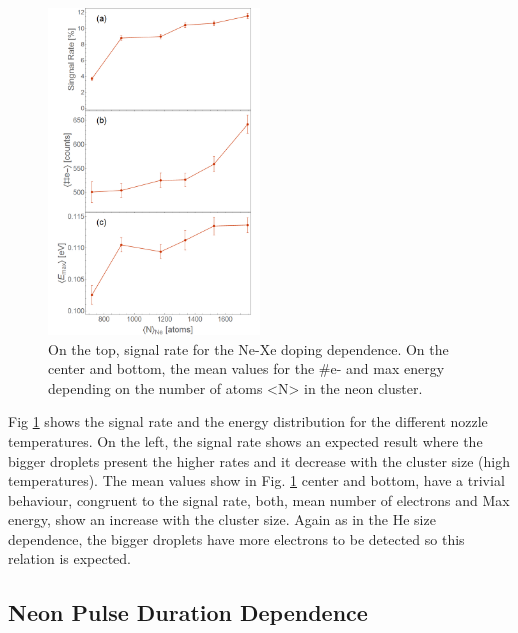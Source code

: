 \begin{figure}[hbtp]
\centering
\includegraphics[width=0.5\textwidth]{../Images/results/MIR_Ne_DropletSize/alltogether.png}
\caption[MIR Ne size dependence. Signal rate and mean values]{On the top, signal rate for the Ne-Xe doping dependence. On the center and bottom, the mean values for the $\#$e- and max energy depending on the number of atoms <N> in the neon cluster.}
\label{fig:Nesizeall}
\end{figure}

Fig \ref{fig:Nesizeall} shows the signal rate and the energy distribution for the different nozzle temperatures. On the left, the signal rate shows an expected result where the bigger droplets present the higher rates and it decrease with the cluster size (high temperatures). The mean values show in Fig. \ref{fig:Nesizeall} center and bottom, have a trivial behaviour, congruent to the signal rate, both, mean number of electrons and Max energy, show an increase   with the cluster size. Again as in the He size dependence, the bigger droplets have more electrons to be detected so this relation is expected.

%


\subsection{Neon Pulse Duration Dependence}

